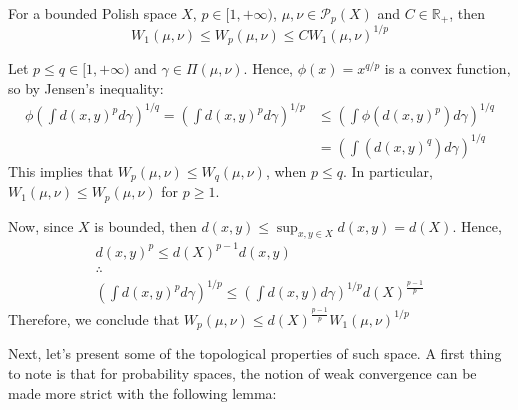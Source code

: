 \begin{proposition}
  For a bounded Polish space $X$, $p \in [1,+\infty)$, $\mu,\nu \in \mathcal P_p(X)$ and $C\in \mathbb R_+$, then
  \begin{equation}
    W_1(\mu,\nu) \leq W_p(\mu,\nu) \leq CW_1(\mu,\nu)^{1/p}
  \end{equation}
  \label{prop:ineqwasserstein}
\end{proposition}
\begin{prf}
  Let $p\leq q \in [1,+\infty)$ and $\gamma \in \Pi(\mu,\nu)$. Hence, $\phi(x)=x^{q/p}$ is a convex function, so by Jensen's
  inequality:
  \begin{align*}
    \phi\left(
    \int d(x,y)^p d\gamma
    \right)^{1/q} =
    \left(
    \int d(x,y)^p d\gamma
    \right)^{1/p}
     & \leq
    \left(
    \int \phi(d(x,y)^p) d\gamma
    \right)^{1/q} \\
     & =
    \left(
    \int (d(x,y)^q) d\gamma
    \right)^{1/q}
  \end{align*}
  This implies that $W_p(\mu,\nu) \leq W_q(\mu,\nu)$, when $p\leq q$. In particular,
  $W_1(\mu,\nu)\leq W_p(\mu,\nu)$ for $p\geq 1$.

  Now, since $X$ is bounded, then $d(x,y) \leq \sup_{x,y \in X}d(x,y) = d(X)$. Hence,
  \begin{gather*}
    d(x,y)^p \leq d(X)^{p-1}d(x,y) \\
    \therefore
    \\
    \left(
    \int d(x,y)^p d\gamma
    \right)^{1/p} \leq
    \left(
    \int d(x,y) d\gamma
    \right)^{1/p}d(X)^{\frac{p-1}{p}}
  \end{gather*}
  Therefore, we conclude that $W_p(\mu,\nu)\leq d(X)^{\frac{p-1}{p}} W_1(\mu,\nu)^{1/p}$

\end{prf}

Next, let's present some of the topological properties of such space.	A first thing to note is that
for probability spaces, the notion of weak convergence can be made more strict with the following lemma:

